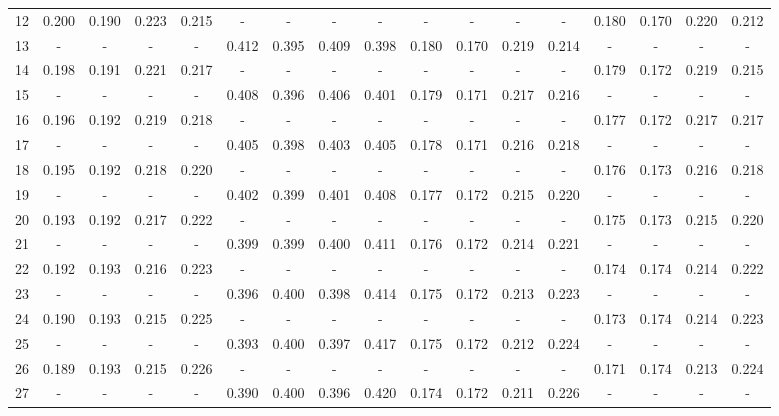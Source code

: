 \documentclass{report}
\begin{document}
\begin{appendices}
\begin{sidewaystable}
\begin{tabular}{|c|cccc|cccc|cccc|cccc|}
12 & 0.200 & 0.190 & 0.223 & 0.215 &   -   &   -   &   -   &   -   &   -   &   -   &   -   &   -   & 0.180 & 0.170 & 0.220 & 0.212\\
13 &   -   &   -   &   -   &   -   & 0.412 & 0.395 & 0.409 & 0.398 & 0.180 & 0.170 & 0.219 & 0.214 &   -   &   -   &   -   &   -  \\
14 & 0.198 & 0.191 & 0.221 & 0.217 &   -   &   -   &   -   &   -   &   -   &   -   &   -   &   -   & 0.179 & 0.172 & 0.219 & 0.215\\
15 &   -   &   -   &   -   &   -   & 0.408 & 0.396 & 0.406 & 0.401 & 0.179 & 0.171 & 0.217 & 0.216 &   -   &   -   &   -   &   -  \\
16 & 0.196 & 0.192 & 0.219 & 0.218 &   -   &   -   &   -   &   -   &   -   &   -   &   -   &   -   & 0.177 & 0.172 & 0.217 & 0.217\\
17 &   -   &   -   &   -   &   -   & 0.405 & 0.398 & 0.403 & 0.405 & 0.178 & 0.171 & 0.216 & 0.218 &   -   &   -   &   -   &   -  \\
18 & 0.195 & 0.192 & 0.218 & 0.220 &   -   &   -   &   -   &   -   &   -   &   -   &   -   &   -   & 0.176 & 0.173 & 0.216 & 0.218\\
19 &   -   &   -   &   -   &   -   & 0.402 & 0.399 & 0.401 & 0.408 & 0.177 & 0.172 & 0.215 & 0.220 &   -   &   -   &   -   &   -  \\
20 & 0.193 & 0.192 & 0.217 & 0.222 &   -   &   -   &   -   &   -   &   -   &   -   &   -   &   -   & 0.175 & 0.173 & 0.215 & 0.220\\
21 &   -   &   -   &   -   &   -   & 0.399 & 0.399 & 0.400 & 0.411 & 0.176 & 0.172 & 0.214 & 0.221 &   -   &   -   &   -   &   -  \\
22 & 0.192 & 0.193 & 0.216 & 0.223 &   -   &   -   &   -   &   -   &   -   &   -   &   -   &   -   & 0.174 & 0.174 & 0.214 & 0.222\\
23 &   -   &   -   &   -   &   -   & 0.396 & 0.400 & 0.398 & 0.414 & 0.175 & 0.172 & 0.213 & 0.223 &   -   &   -   &   -   &   -  \\
24 & 0.190 & 0.193 & 0.215 & 0.225 &   -   &   -   &   -   &   -   &   -   &   -   &   -   &   -   & 0.173 & 0.174 & 0.214 & 0.223\\
25 &   -   &   -   &   -   &   -   & 0.393 & 0.400 & 0.397 & 0.417 & 0.175 & 0.172 & 0.212 & 0.224 &   -   &   -   &   -   &   -  \\
26 & 0.189 & 0.193 & 0.215 & 0.226 &   -   &   -   &   -   &   -   &   -   &   -   &   -   &   -   & 0.171 & 0.174 & 0.213 & 0.224\\
27 &   -   &   -   &   -   &   -   & 0.390 & 0.400 & 0.396 & 0.420 & 0.174 & 0.172 & 0.211 & 0.226 &   -   &   -   &   -   &   -  \\

\end{tabular}
\end{sidewaystable}
\end{appendices}
\end{document}
